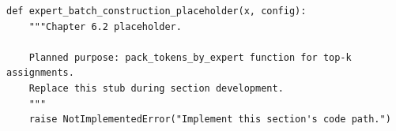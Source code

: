 \begin{lstlisting}[style=bookpython,caption={Planned code placeholder for expert batch construction.},label={lst:ch06-expert-batch-construction}]
def expert_batch_construction_placeholder(x, config):
    """Chapter 6.2 placeholder.

    Planned purpose: pack_tokens_by_expert function for top-k assignments.
    Replace this stub during section development.
    """
    raise NotImplementedError("Implement this section's code path.")
\end{lstlisting}
